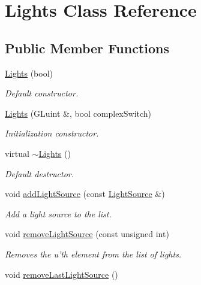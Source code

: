 \hypertarget{class_lights}{\section{Lights Class Reference}
\label{class_lights}
}
\subsection*{Public Member Functions}
\begin{DoxyCompactItemize}
\item 
\hypertarget{class_lights_a6efd204b85c962a046b9c1356d621050}{\hyperlink{class_lights_a6efd204b85c962a046b9c1356d621050}{Lights} (bool)}\label{class_lights_a6efd204b85c962a046b9c1356d621050}

\begin{DoxyCompactList}\small\item\em Default constructor. \end{DoxyCompactList}\item 
\hyperlink{class_lights_a00b1749bc399f2b9d092b8992a52b360}{Lights} (G\-Luint \&, bool complex\-Switch)
\begin{DoxyCompactList}\small\item\em Initialization constructor. \end{DoxyCompactList}\item 
\hypertarget{class_lights_aed5713f8069b09349e0f86e27a474d59}{virtual \hyperlink{class_lights_aed5713f8069b09349e0f86e27a474d59}{$\sim$\-Lights} ()}\label{class_lights_aed5713f8069b09349e0f86e27a474d59}

\begin{DoxyCompactList}\small\item\em Default destructor. \end{DoxyCompactList}\item 
void \hyperlink{class_lights_a5383c1dbc70f74de74cd2b780ef90908}{add\-Light\-Source} (const \hyperlink{class_light_source}{Light\-Source} \&)
\begin{DoxyCompactList}\small\item\em Add a light source to the list. \end{DoxyCompactList}\item 
void \hyperlink{class_lights_a5c1870dad44d2e6cf48b9f8152e10a21}{remove\-Light\-Source} (const unsigned int)
\begin{DoxyCompactList}\small\item\em Removes the u'th element from the list of lights. \end{DoxyCompactList}\item 
\hypertarget{class_lights_a0640af4479575593544ea68115e40ea5}{void \hyperlink{class_lights_a0640af4479575593544ea68115e40ea5}{remove\-Last\-Light\-Source} ()}\label{class_lights_a0640af4479575593544ea68115e40ea5}


\end{DoxyCompactItemize}
